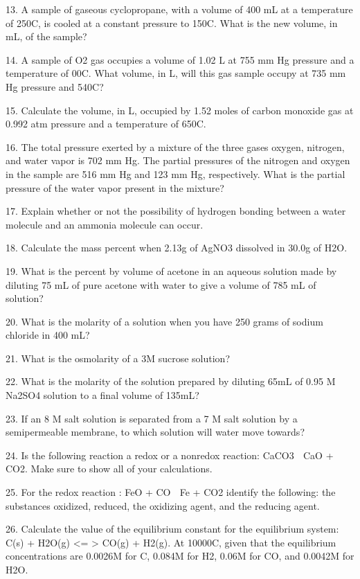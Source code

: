 \documentclass[addpoints, 12pt]{exam}
\begin{document}
\begin{questions}
\begin{parts}
13. A sample of gaseous cyclopropane, with a volume of 400 mL at a temperature of 250C, is cooled at a constant pressure to 150C.  What is the new volume, in mL, of the sample?



14. A sample of O2 gas occupies a volume of 1.02 L at 755 mm Hg pressure and a temperature of 00C.  What volume, in L, will this gas sample occupy at 735 mm Hg pressure and 540C?


15. Calculate the volume, in L, occupied by 1.52 moles of carbon monoxide gas at 0.992 atm pressure and a temperature of 650C.


16. The total pressure exerted by a mixture of the three gases oxygen, nitrogen, and water vapor is 702 mm Hg.  The partial pressures of the nitrogen and oxygen in the sample are 516 mm Hg and 123 mm Hg, respectively.  What is the partial pressure of the water vapor present in the mixture?



17. Explain whether or not the possibility of hydrogen bonding between a water molecule and an ammonia molecule can occur.


18. Calculate the mass percent when 2.13g of AgNO3 dissolved in 30.0g of H2O.


19. What is the percent by volume of acetone in an aqueous solution made by diluting 75 mL of pure acetone with water to give a volume of 785 mL of solution?  



20. What is the molarity of a solution when you have 250 grams of sodium chloride in 400 mL?



21. What is the osmolarity of a 3M sucrose solution?

22. What is the molarity of the solution prepared by diluting 65mL of 0.95 M Na2SO4 solution to a final volume of 135mL?


23. If an 8 M salt solution is separated from a 7 M salt solution by a semipermeable membrane, to which solution will water move towards?

24. Is the following reaction a redox or a nonredox reaction:  CaCO3  CaO + CO2.   Make sure to show all of your calculations.


25. For the redox reaction : FeO + CO  Fe + CO2  identify the following: the substances oxidized, reduced, the oxidizing agent, and the reducing agent.

26. Calculate the value of the equilibrium constant for the equilibrium system:                  C(s) + H2O(g) <= > CO(g) + H2(g).  At 10000C, given that the equilibrium concentrations are 0.0026M for C, 0.084M for H2, 0.06M for CO, and 0.0042M for H2O.




\end{parts}
\end{questions}
\end{document}
